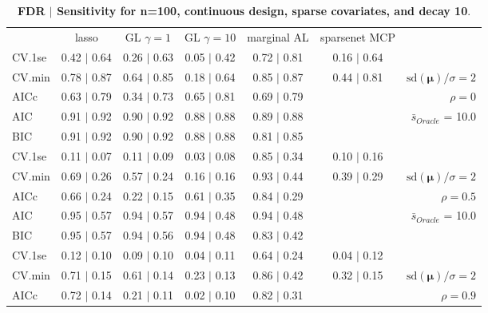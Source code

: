 \begin{table}\vspace{-.5cm}
\caption[l]{ {\it }
{ \bf FDR $\boldsymbol{\mid}$ Sensitivity for n=100, continuous design, sparse covariates, and  decay  10}.}
\vspace{-.5cm}
\footnotesize{}
\begin{center}
\begin{tabular}{l*{5}{c}|r}
 & lasso & GL $\gamma=1$ & GL $\gamma=10$ & marginal AL & sparsenet MCP  & \\
 \cline{1-7}
CV.1se & 0.42 $\mid$ 0.64 & 0.26 $\mid$ 0.63 & 0.05 $\mid$ 0.42 & 0.72 $\mid$ 0.81 & 0.16 $\mid$ 0.64 & \\
CV.min & 0.78 $\mid$ 0.87 & 0.64 $\mid$ 0.85 & 0.18 $\mid$ 0.64 & 0.85 $\mid$ 0.87 & 0.44 $\mid$ 0.81 &  $\mathrm{sd}(\mathbf{\mu})/\sigma=2$ \\
AICc & 0.63 $\mid$ 0.79 & 0.34 $\mid$ 0.73 & 0.65 $\mid$ 0.81 & 0.69 $\mid$ 0.79 & & $\rho=0$ \\
AIC & 0.91 $\mid$ 0.92 & 0.90 $\mid$ 0.92 & 0.88 $\mid$ 0.88 & 0.89 $\mid$ 0.88 & &  \multirow{2}{*}{$\bar{s}_{Oracle}$ = 10.0} \\
BIC & 0.91 $\mid$ 0.92 & 0.90 $\mid$ 0.92 & 0.88 $\mid$ 0.88 & 0.81 $\mid$ 0.85 & &  \\
 \hline 
CV.1se & 0.11 $\mid$ 0.07 & 0.11 $\mid$ 0.09 & 0.03 $\mid$ 0.08 & 0.85 $\mid$ 0.34 & 0.10 $\mid$ 0.16 & \\
CV.min & 0.69 $\mid$ 0.26 & 0.57 $\mid$ 0.24 & 0.16 $\mid$ 0.16 & 0.93 $\mid$ 0.44 & 0.39 $\mid$ 0.29 &  $\mathrm{sd}(\mathbf{\mu})/\sigma=2$ \\
AICc & 0.66 $\mid$ 0.24 & 0.22 $\mid$ 0.15 & 0.61 $\mid$ 0.35 & 0.84 $\mid$ 0.29 & & $\rho=0.5$ \\
AIC & 0.95 $\mid$ 0.57 & 0.94 $\mid$ 0.57 & 0.94 $\mid$ 0.48 & 0.94 $\mid$ 0.48 & &  \multirow{2}{*}{$\bar{s}_{Oracle}$ = 10.0} \\
BIC & 0.95 $\mid$ 0.57 & 0.94 $\mid$ 0.56 & 0.94 $\mid$ 0.48 & 0.83 $\mid$ 0.42 & &  \\
 \hline 
CV.1se & 0.12 $\mid$ 0.10 & 0.09 $\mid$ 0.10 & 0.04 $\mid$ 0.11 & 0.64 $\mid$ 0.24 & 0.04 $\mid$ 0.12 & \\
CV.min & 0.71 $\mid$ 0.15 & 0.61 $\mid$ 0.14 & 0.23 $\mid$ 0.13 & 0.86 $\mid$ 0.42 & 0.32 $\mid$ 0.15 &  $\mathrm{sd}(\mathbf{\mu})/\sigma=2$ \\
AICc & 0.72 $\mid$ 0.14 & 0.21 $\mid$ 0.11 & 0.02 $\mid$ 0.10 & 0.82 $\mid$ 0.31 & & $\rho=0.9$ \\

\end{tabular}
\end{center}
\end{table}
